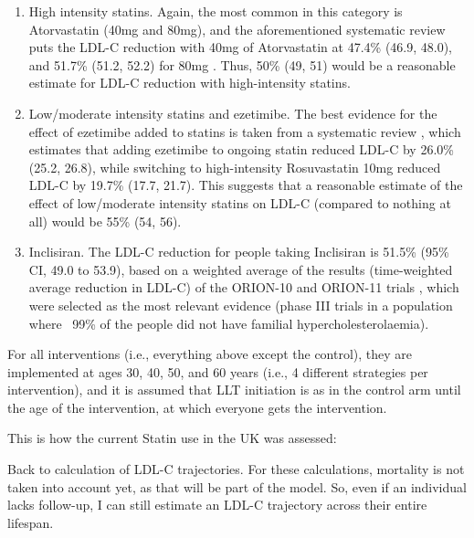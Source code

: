 \documentclass[11pt]{article}
\begin{document}
\begin{enumerate}
\item High intensity statins. Again, the most common in this category is Atorvastatin (40mg and 80mg), and the aforementioned
systematic review puts the LDL-C reduction with 40mg of Atorvastatin at 47.4\% (46.9, 48.0), and 51.7\% (51.2, 52.2) for 80mg 
\cite{AdamsCDSR2015}. 
Thus, 50\% (49, 51) would be a reasonable estimate for LDL-C reduction with high-intensity statins. 
\item Low/moderate intensity statins and ezetimibe. The best evidence for the effect of ezetimibe added to statins is 
taken from a systematic review \cite{AmbeAth2014}, which estimates that adding ezetimibe to ongoing statin reduced LDL-C by 26.0\% 
(25.2, 26.8), while switching to high-intensity Rosuvastatin 10mg reduced LDL-C by 19.7\% (17.7, 21.7). This suggests
that a reasonable estimate of the effect of low/moderate intensity statins on LDL-C (compared to nothing at all) would be 55\% 
(54, 56). 
\item Inclisiran. The LDL-C reduction for people taking Inclisiran is 51.5\% (95\% CI, 49.0 to 53.9), 
based on a weighted average of the results (time-weighted average reduction in LDL-C) 
of the ORION-10 and ORION-11 trials \cite{KausikNEJM2020},
which were selected as the most relevant evidence (phase III trials in a population where ~99\% of the people did
not have familial hypercholesterolaemia). 
\end{enumerate}

For all interventions (i.e., everything above except the control), they are implemented at ages 30, 40, 50, and 60 years
(i.e., 4 different strategies per intervention), and it is assumed that LLT initiation is as in the control arm until 
the age of the intervention, at which everyone gets the intervention. 

This is how the current Statin use in the UK was assessed: 


\color{Blue4}
\begin{stlog}\end{stlog}
\begin{stlog}\end{stlog}
\begin{stlog}\end{stlog}
\color{black}

Back to calculation of LDL-C trajectories. 
For these calculations, mortality is not taken into account yet, as that will be part of the model. 
So, even if an individual lacks follow-up, I can still estimate an LDL-C trajectory across their
entire lifespan.
\end{document}
